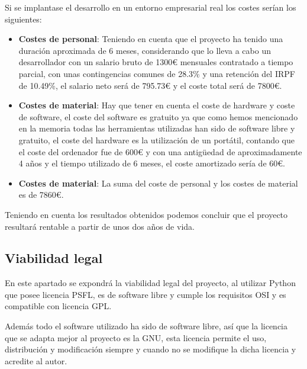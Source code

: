 Si se implantase el desarrollo en un entorno empresarial real los costes serían los siguientes:

\begin{itemize}
	\item \textbf{Costes de personal}: Teniendo en cuenta que el proyecto ha tenido una duración aproximada de 6 meses, considerando que lo lleva a cabo un desarrollador con un salario bruto de 1300\textup{\euro} mensuales contratado a tiempo parcial, con unas contingencias comunes\cite{seguridadSocial} de 28.3\%  y una retención del IRPF de 10.49\%, el salario neto será de 795.73\textup{\euro} y el coste total será de 7800\textup{\euro}.
	
	\item \textbf{Costes de material}: Hay que tener en cuenta el coste de hardware y coste de software, el coste del software es gratuito ya que como hemos mencionado en la memoria todas las herramientas utilizadas han sido de software libre y gratuito, el coste del hardware es la utilización de un portátil, contando que el coste del ordenador fue de 600\textup{\euro} y con una antigüedad de aproximadamente 4 años y el tiempo utilizado de 6 meses, el coste amortizado sería de 60\textup{\euro}.
	
	\item \textbf{Costes de material}: La suma del coste de personal y los costes de material es de 7860\textup{\euro}.

\end{itemize}

	Teniendo en cuenta los resultados obtenidos podemos concluir que el proyecto resultará rentable a partir de unos dos años de vida.
	
\subsection{Viabilidad legal}

	En este apartado se expondrá la viabilidad legal del proyecto, al utilizar Python que posee licencia PSFL\cite{licencia}, es de software libre y cumple los requisitos OSI y es compatible con licencia GPL.
	
	Además todo el software utilizado ha sido de software libre, así que la licencia que se adapta mejor al proyecto es la GNU\cite{gnu}, esta licencia permite el uso, distribución y modificación siempre y cuando no se modifique la dicha licencia y acredite al autor.
	
	
